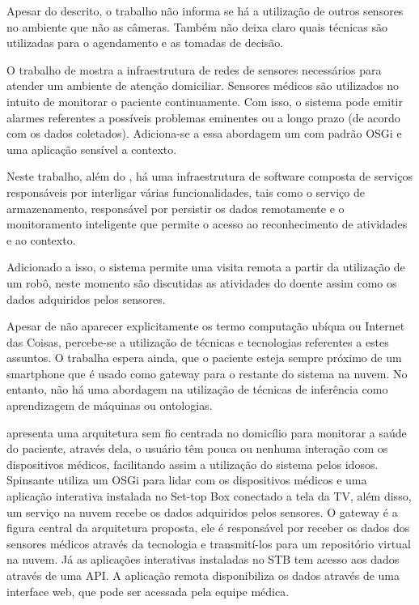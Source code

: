 Apesar do descrito, o trabalho não informa se há a utilização de outros
sensores no ambiente que não as câmeras. Também não deixa claro quais
técnicas são utilizadas para o agendamento e as tomadas de decisão.

O trabalho de  mostra a infraestrutura de redes
de sensores necessários para atender um ambiente de atenção domiciliar.
Sensores médicos são utilizados no intuito de monitorar o paciente
continuamente. Com isso, o sistema pode emitir alarmes referentes a possíveis
problemas eminentes ou a longo prazo (de acordo com os dados coletados).
Adiciona-se a essa abordagem um \middleware[] com padrão OSGi e uma aplicação
sensível a contexto.

Neste trabalho, além do \middleware, há uma infraestrutura de software composta
de serviços responsáveis por interligar várias funcionalidades, tais como o
serviço de armazenamento, responsável por persistir os dados remotamente e o
monitoramento inteligente que permite o acesso ao reconhecimento de atividades
e ao contexto.  

Adicionado a isso, o sistema permite uma visita remota a partir da utilização
de um robô, neste momento são discutidas as atividades do doente assim como os
dados adquiridos pelos sensores.

Apesar de não aparecer explicitamente os termo computação ubíqua ou Internet
das Coisas, percebe-se a utilização de técnicas e tecnologias referentes a
estes assuntos. O trabalha espera ainda, que o paciente esteja sempre próximo
de um smartphone que é usado como gateway para o restante do sistema na nuvem.
No entanto, não há uma abordagem na utilização de técnicas de inferência como
aprendizagem de máquinas ou ontologias.

 apresenta uma arquitetura sem fio centrada no
domicílio para monitorar a saúde do paciente, através dela, o usuário têm pouca
ou nenhuma interação com os dispositivos médicos, facilitando assim a
utilização do sistema pelos idosos. Spinsante utiliza um \framework[] OSGi para
lidar com os dispositivos médicos e uma aplicação interativa instalada no
Set-top Box conectado a tela da TV, além disso, um serviço na nuvem recebe os
dados adquiridos pelos sensores. O gateway é a figura central da arquitetura
proposta, ele é responsável por receber os dados dos sensores médicos através
da tecnologia \bluetooth[] e transmití-los para um repositório virtual na nuvem.
Já as aplicações interativas instaladas no STB tem acesso aos dados através de
uma API. A aplicação remota disponibiliza os dados através de uma interface
web, que pode ser acessada pela equipe médica.

